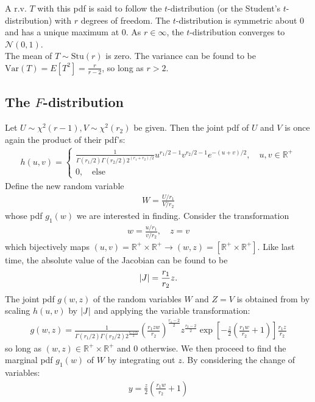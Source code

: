 \documentclass{book}
\theoremstyle{definition}
\newcommand{\R}{\mathbb{R}}
\newcommand{\Else}{\text{else}}
\newcommand{\N}{\mathcal{N}}
\newcommand{\f}[2]{\frac{#1}{#2}}
\newcommand{\lp}{\left(}
\newcommand{\rp}{\right)}
\newcommand{\lb}{\left[}
\newcommand{\rb}{\right]}
\begin{document}
A r.v. $T$ with this pdf is said to follow the $t$-distribution (or the Student's $t$-distribution) with $r$ degrees of freedom. The $t$-distribution is symmetric about 0 and has a unique maximum at 0. As $r\in \infty$, the $t$-distribution converges to $\N(0,1)$. \\

The mean of $T \sim \text{Stu}(r)$ is zero. The variance can be found to be $\text{Var}(T) = E[T^2] = \f{r}{r-2}$, so long as $r>2$. 
   





\subsection{The $F$-distribution}
Let $U \sim \chi^2(r-1), V\sim \chi^2(r_2)$ be given. Then the joint pdf of $U$ and $V$ is once again the product of their pdf's:
\begin{align}
h(u,v) = \begin{cases}
\f{1}{\Gamma(r_1/2)\Gamma(r_2/2) 2^{(r_1+r_2)/2}}u^{r_1/2-1}v^{r_2/2-1}e^{-(u+v)/2}, \quad u,v \in \R^+\\
0,\quad \Else
\end{cases}
\end{align}
Define the new random variable 
\begin{align}
W = \f{U/r_1}{V/r_2}
\end{align}
whose pdf $g_1(w)$ we are interested in finding. Consider the transformation
\begin{align}
w = \f{u/r_1}{v/r_2}, \quad z=v
\end{align}
which bijectively maps $(u,v) = \R^+\times \R^+ \to (w,z) = [\R^+\times \R^+]$. Like last time, the absolute value of the Jacobian can be found to be
\begin{align}
\abs{J} = \f{r_1}{r_2}z.
\end{align}
The joint pdf $g(w,z)$ of the random variables $W$ and $Z=V$ is obtained from by scaling $h(u,v)$ by $\abs{J}$ and applying the variable transformation:
\begin{align}
g(w,z) = 
\f{1}{\Gamma(r_1/2)\Gamma(r_2/2) 2^{\f{r_1+r_2}{2}}} \lp \f{r_1 zw}{r_2} \rp^{\f{r_1-2}{2}}z^{\f{r_2-2}{2}}\exp\lb -\f{z}{2}\lp \f{r_1w}{r_2} +1 \rp\rb \f{r_1z}{r_2}
\end{align}
so long as $(w,z)\in \R^+\times \R^+$ and 0 otherwise. We then proceed to find the marginal pdf $g_1(w)$ of $W$ by integrating out $z$. By considering the change of variables:
\begin{align}
y = \f{z}{2}\lp \f{r_1w}{r_2} + 1 \rp
\end{align}
\end{document}
